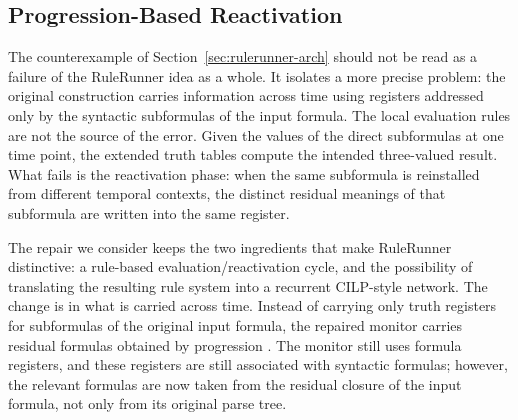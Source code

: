 \subsection{Progression-Based Reactivation}
\label{sec:rulerunner-progression}

The counterexample of Section~\ref{sec:rulerunner-arch} should not be read as a failure of the RuleRunner idea as a whole. It isolates a more precise problem: the original construction carries information across time using registers addressed only by the syntactic subformulas of the input formula. The local evaluation rules are not the source of the error. Given the values of the direct subformulas at one time point, the extended truth tables compute the intended three-valued result. What fails is the reactivation phase: when the same subformula is reinstalled from different temporal contexts, the distinct residual meanings of that subformula are written into the same register.

The repair we consider keeps the two ingredients that make RuleRunner distinctive: a rule-based evaluation/reactivation cycle, and the possibility of translating the resulting rule system into a recurrent CILP-style network. The change is in what is carried across time. Instead of carrying only truth registers for subformulas of the original input formula, the repaired monitor carries residual formulas obtained by progression \cite{emerson90,bacchus&kabanza98}. The monitor still uses formula registers, and these registers are still associated with syntactic formulas; however, the relevant formulas are now taken from the residual closure of the input formula, not only from its original parse tree.

